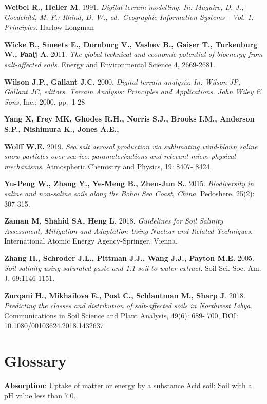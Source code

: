 \documentclass[
  10pt,
  b5paper,
]{book}
\begin{document}
\textbf{Weibel R., Heller M}. 1991. \emph{Digital terrain modelling. In: Maguire, D. J.; Goodchild, M. F.; Rhind, D. W., ed.~Geographic Information Systems - Vol. 1: Principles}. Harlow Longman

\textbf{Wicke B., Smeets E., Dornburg V., Vashev B., Gaiser T., Turkenburg W., Faaij A}. 2011. \emph{The global technical and economic potential of bioenergy from salt-affected soils}. Energy and Environmental Science 4, 2669-2681.

\textbf{Wilson J.P., Gallant J.C.} 2000. \emph{Digital terrain analysis. In: Wilson JP, Gallant JC, editors. Terrain Analysis: Principles and Applications. John Wiley \& Sons}, Inc.; 2000. pp.~1-28

\textbf{Yang X, Frey MK, Ghodes R.H., Norris S.J., Brooks I.M., Anderson S.P., Nishimura K., Jones A.E.,}

\textbf{Wolff W.E.} 2019. \emph{Sea salt aerosol production via sublimating wind-blown saline snow particles over sea-ice: parameterizations and relevant micro-physical mechanisms}. Atmospheric Chemistry and Physics, 19: 8407- 8424.

\textbf{Yu-Peng W., Zhang Y., Ye-Meng B., Zhen-Jun S.}. 2015. \emph{Biodiversity in saline and non-saline soils along the Bohai Sea Coast, China}. Pedoshere, 25(2): 307-315.

\textbf{Zaman M, Shahid SA, Heng L.} 2018. \emph{Guidelines for Soil Salinity Assessment, Mitigation and Adaptation Using Nuclear and Related Techniques}. International Atomic Energy Agency-Springer, Vienna.

\textbf{Zhang H., Schroder J.L., Pittman J.J., Wang J.J., Payton M.E.} 2005. \emph{Soil salinity using saturated paste and 1:1 soil to water extract}. Soil Sci. Soc. Am. J. 69:1146-1151.

\textbf{Zurqani H., Mikhailova E., Post C., Schlautman M., Sharp J}. 2018. \emph{Predicting the classes and distribution of salt-affected soils in Northwest Libya}. Communications in Soil Science and Plant Analysis, 49(6): 689- 700, DOI: 10.1080/00103624.2018.1432637

\hypertarget{glossary}{%
\chapter*{Glossary}\label{glossary}}

\textbf{Absorption}: Uptake of matter or energy by a substance Acid soil: Soil with a pH value less than 7.0.
\end{document}

